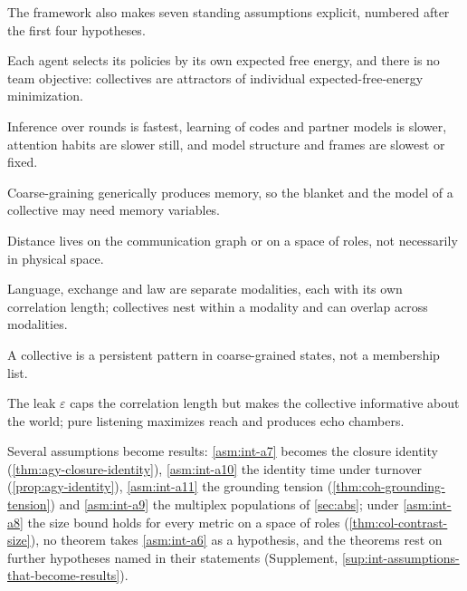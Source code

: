 The framework also makes seven standing assumptions explicit, numbered after the first four hypotheses.

\setcounter{premise}{4}
\begin{premise}[Individualism]\label{asm:int-a5}
Each agent selects its policies by its own expected free energy, and there is no team objective: collectives are attractors of individual expected-free-energy minimization.
\end{premise}
\begin{premise}[Timescales]\label{asm:int-a6}
Inference over rounds is fastest, learning of codes and partner models is slower, attention habits are slower still, and model structure and frames are slowest or fixed.
\end{premise}
\begin{premise}\label{asm:int-a7}
Coarse-graining generically produces memory, so the blanket and the model of a collective may need memory variables.
\end{premise}
\begin{premise}\label{asm:int-a8}
Distance lives on the communication graph or on a space of roles, not necessarily in physical space.
\end{premise}
\begin{premise}[Multiplexity]\label{asm:int-a9}
Language, exchange and law are separate modalities, each with its own correlation length; collectives nest within a modality and can overlap across modalities.
\end{premise}
\begin{premise}\label{asm:int-a10}
A collective is a persistent pattern in coarse-grained states, not a membership list.
\end{premise}
\begin{premise}\label{asm:int-a11}
The leak $\varepsilon$ caps the correlation length but makes the collective informative about the world; pure listening maximizes reach and produces echo chambers.
\end{premise}

Several assumptions become results: \cref{asm:int-a7} becomes the closure identity (\cref{thm:agy-closure-identity}), \cref{asm:int-a10} the identity time under turnover (\cref{prop:agy-identity}), \cref{asm:int-a11} the grounding tension (\cref{thm:coh-grounding-tension}) and \cref{asm:int-a9} the multiplex populations of \cref{sec:abs}; under \cref{asm:int-a8} the size bound holds for every metric on a space of roles (\cref{thm:col-contrast-size}), no theorem takes \cref{asm:int-a6} as a hypothesis, and the theorems rest on further hypotheses named in their statements (Supplement, \cref{sup:int-assumptions-that-become-results}).

